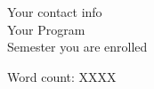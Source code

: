 \begin{titlepage}
Your contact info \\ %
Your Program \\ %
Semester you are enrolled \\ %

\vfill %


\vfill %
	
Word count: XXXX %
	

	
\end{titlepage}